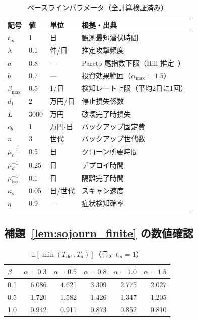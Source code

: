 \documentclass[12pt,a4paper]{article}
\theoremstyle{plain}
\theoremstyle{definition}
\theoremstyle{remark}
\newcommand{\E}{\mathbb{E}}
\newcommand{\Tdet}{T_{\mathrm{det}}}
\begin{document}
\begin{table}[h]
\centering\small
\caption{ベースラインパラメータ（全計算検証済み）}
\label{tab:params}
\begin{tabular}{@{}lll p{54mm}@{}}
\toprule
記号 & 値 & 単位 & 根拠・出典 \\
\midrule
$t_m$ & 1 & 日 & 観測最短潜伏時間~\cite{mandiant2023} \\
$\lambda$ & 0.1 & 件/日 & 推定攻撃頻度 \\
$a$ & 0.8 & --- & Pareto 尾指数下限（Hill 推定~\cite{hill1975}）\\
$b$ & 0.7 & --- & 投資効果範囲（$\alpha_{\max}=1.5$）\\
$\beta_{\max}$ & 0.5 & 1/日 & 検知レート上限（平均2日に1回） \\
$d_1$ & 2 & 万円/日 & 停止損失係数 \\
$L$ & 3000 & 万円 & 破壊完了時損失 \\
$c_b$ & 1 & 万円$\cdot$日 & バックアップ固定費 \\
$n$ & 3 & 世代 & バックアップ世代数 \\
$\mu_c^{-1}$ & 0.5 & 日 & クローン所要時間 \\
$\mu_d^{-1}$ & 0.25 & 日 & デプロイ時間 \\
$\mu_{\mathrm{iso}}^{-1}$ & 0.1 & 日 & 隔離完了時間 \\
$\kappa_s$ & 0.05 & 日/世代 & スキャン速度 \\
$\eta$ & 0.9 & --- & 症状検知確率 \\
\bottomrule
\end{tabular}
\end{table}

\subsection{補題~\ref{lem:sojourn_finite} の数値確認}

\begin{table}[h]
\centering
\caption{$\E[\min(\Tdet,T_d)]$（日，$t_m=1$）}
\label{tab:sojourn}
\begin{tabular}{@{}lrrrrr@{}}
\toprule
$\beta$ & $\alpha=0.3$ & $\alpha=0.5$ & $\alpha=0.8$ & $\alpha=1.0$ & $\alpha=1.5$ \\
\midrule
0.1 & 6.086 & 4.621 & 3.309 & 2.775 & 2.027 \\
0.5 & 1.720 & 1.582 & 1.426 & 1.347 & 1.205 \\
1.0 & 0.942 & 0.911 & 0.873 & 0.852 & 0.810 \\
\bottomrule
\end{tabular}
\end{table}
\end{document}
